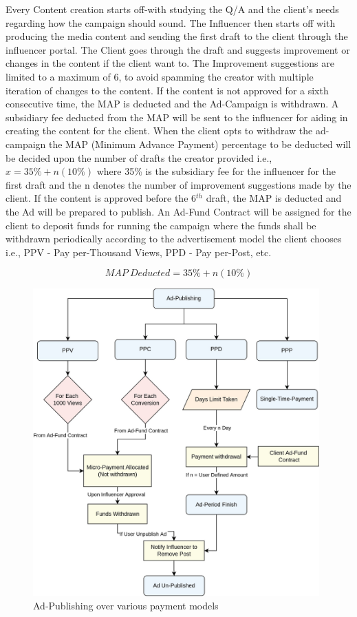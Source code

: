 \documentclass[conference]{IEEEtran}
\begin{document}
Every Content creation starts off-with studying the Q/A and the client's needs regarding how the campaign should sound. The Influencer then starts off with producing the media content and sending the first draft to the client through the influencer portal. The Client goes through the draft and suggests improvement or changes in the content if the client want to. The Improvement suggestions are limited to a maximum of 6, to avoid spamming the creator with multiple iteration of changes to the content. If the content is not approved for a sixth consecutive time, the MAP is deducted and the Ad-Campaign is withdrawn. A subsidiary fee deducted from the MAP will be sent to the influencer for aiding in creating the content for the client. When the client opts to withdraw the ad-campaign the MAP (Minimum Advance Payment) percentage to be deducted will be decided upon the number of drafts the creator provided i.e., $x=35\%+n(10\%)$ where 35\% is the subsidiary fee for the influencer for the first draft and the n denotes the number of improvement suggestions made by the client. If the content is approved before the 6$^{th}$ draft, the MAP is deducted and the Ad will be prepared to publish. An Ad-Fund Contract will be assigned for the client to deposit funds for running the campaign where the funds shall be withdrawn periodically according to the advertisement model the client chooses i.e., PPV - Pay per-Thousand Views, PPD - Pay per-Post, etc.

\begin{equation}
MAP\:Deducted=35\%+n(10\%)
\end{equation}

\begin{figure}
\begin{center}
\includegraphics[width=11cm]{ad-publish}
\caption{Ad-Publishing over various payment models}
\end{center}
\end{figure}
\end{document}
